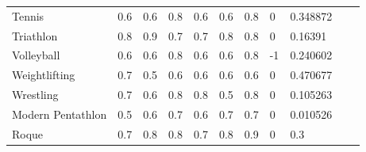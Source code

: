 \documentclass[a4paper]{article}
\begin{document}
\begin{table}[h]
\begin{tabular}{|l|lllllll|l|ll}
    Tennis                                      & \multicolumn{1}{l|}{0.6}      & \multicolumn{1}{l|}{0.6}      & \multicolumn{1}{l|}{0.8}  & \multicolumn{1}{l|}{0.6}  & \multicolumn{1}{l|}{0.6}  & \multicolumn{1}{l|}{0.8}      & 0                       & 0.348872                                               &  &  \\ \cline{1-9}
    Triathlon                                   & \multicolumn{1}{l|}{0.8}      & \multicolumn{1}{l|}{0.9}      & \multicolumn{1}{l|}{0.7}  & \multicolumn{1}{l|}{0.7}  & \multicolumn{1}{l|}{0.8}  & \multicolumn{1}{l|}{0.8}      & 0                       & 0.16391                                                &  &  \\ \cline{1-9}
    Volleyball                                  & \multicolumn{1}{l|}{0.6}      & \multicolumn{1}{l|}{0.6}      & \multicolumn{1}{l|}{0.8}  & \multicolumn{1}{l|}{0.6}  & \multicolumn{1}{l|}{0.6}  & \multicolumn{1}{l|}{0.8}      & -1                      & 0.240602                                               &  &  \\ \cline{1-9}
    Weightlifting                               & \multicolumn{1}{l|}{0.7}      & \multicolumn{1}{l|}{0.5}      & \multicolumn{1}{l|}{0.6}  & \multicolumn{1}{l|}{0.6}  & \multicolumn{1}{l|}{0.6}  & \multicolumn{1}{l|}{0.6}      & 0                       & 0.470677                                               &  &  \\ \cline{1-9}
    Wrestling                                   & \multicolumn{1}{l|}{0.7}      & \multicolumn{1}{l|}{0.6}      & \multicolumn{1}{l|}{0.8}  & \multicolumn{1}{l|}{0.8}  & \multicolumn{1}{l|}{0.5}  & \multicolumn{1}{l|}{0.8}      & 0                       & 0.105263                                               &  &  \\ \cline{1-9}
    Modern Pentathlon                           & \multicolumn{1}{l|}{0.5}      & \multicolumn{1}{l|}{0.6}      & \multicolumn{1}{l|}{0.7}  & \multicolumn{1}{l|}{0.6}  & \multicolumn{1}{l|}{0.7}  & \multicolumn{1}{l|}{0.7}      & 0                       & 0.010526                                               &  &  \\ \cline{1-9}
    Roque                                       & \multicolumn{1}{l|}{0.7}      & \multicolumn{1}{l|}{0.8}      & \multicolumn{1}{l|}{0.8}  & \multicolumn{1}{l|}{0.7}  & \multicolumn{1}{l|}{0.8}  & \multicolumn{1}{l|}{0.9}      & 0                       & 0.3                                                    &  &  \\ \cline{1-9}
    \end{tabular}
    \end{table}
\end{document}

